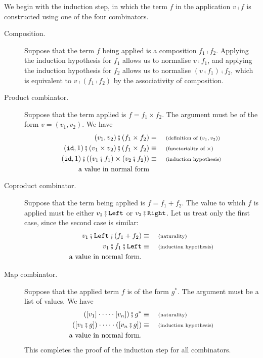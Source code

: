 We begin with the induction step, in which the term $f$ in the application $v\comp{}f$ is constructed using one of the four combinators. 
\begin{description}
    \item[Composition.] Suppose that the term $f$ being applied is  a composition $f_1\comp{}f_2$. Applying the induction hypothesis for $f_1$ allows us to normalise $v\comp{}f_1$, and applying the induction hypothesis for $f_2$ allows us to normalise $(v\comp{}f_1)\comp{}f_2$, which is equivalent to $v\comp(f_1\comp{}f_2)$ by the associativity of composition.
    \item[Product combinator.]      Suppose that the term applied is $f = f_1 \times f_2$.  The argument must be of the form $v = (v_1,v_2)$. We have
    \begin{align*}
    (v_1,v_2)\comp(f_1 \times f_2)&= \why{definition of $(v_1,v_2)$} \\
        \appendoneterm\comp(v_1 \times v_2)\comp(f_1 \times f_2)\equalbecause{functoriality of $\times$}\\
    \appendoneterm\comp((v_1\comp{}f_1) \times (v_2\comp{}f_2))\equalbecause{induction hypothesis} \\
        \text{a value in normal form}
    \end{align*}
    \item[Coproduct combinator.] Suppose that the term being applied is $f = f_1 + f_2$. The value to   which $f$ is applied  must be either $v_1 \comp \leftterm$ or $v_2\comp \rightterm$.  Let us treat only the first case, since the second case is similar:
    \begin{align*}
    v_1 \comp \leftterm\comp (f_1 + f_2)\equalbecause{naturality} \\
    v_1 \comp f_1\comp \leftterm  \equalbecause{induction hypothesis}\\
    \text{a value in normal form}.
    \end{align*}


    \item[Map combinator.] Suppose that the applied term $f$ is of the form $g^*$. The argument must be a list of values. We have 
    \begin{align*}
    ([v_1] \wdot \cdots \wdot [v_n])\comp{}g^* \equalbecause{naturality} \\
    ([v_1\comp{}g]) \wdot \cdots \wdot ([v_n\comp{}g]) \equalbecause{induction hypothesis} \\
    \text{a value in normal form}.
    \end{align*}
   This completes the proof of the induction step for all combinators. 
\end{description}


